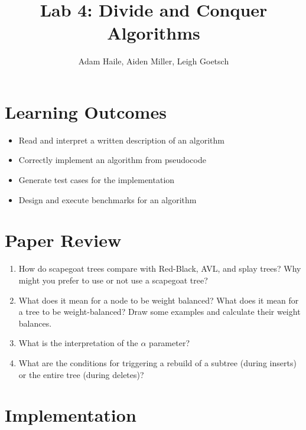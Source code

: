 \documentclass{labReport}
\title{Lab 4: Divide and Conquer Algorithms}
\author{Adam Haile, Aiden Miller, Leigh Goetsch}
\begin{document}
\maketitle

\section*{Learning Outcomes}
\begin{itemize}
    \item Read and interpret a written description of an algorithm
    \item Correctly implement an algorithm from pseudocode
    \item Generate test cases for the implementation
    \item Design and execute benchmarks for an algorithm
\end{itemize}


\newpage

\section{Paper Review}
\begin{enumerate}
    \item How do scapegoat trees compare with Red-Black, AVL, and splay trees? Why might you prefer to use or not use a scapegoat tree?\\

    \item What does it mean for a node to be weight balanced? What does it mean for a tree to be weight-balanced? Draw some examples and calculate their weight balances.\\

    \item What is the interpretation of the $\alpha$ parameter?\\

    \item What are the conditions for triggering a rebuild of a subtree (during inserts) or the entire tree (during deletes)?\\

\end{enumerate}

\section{Implementation}
\end{document}
